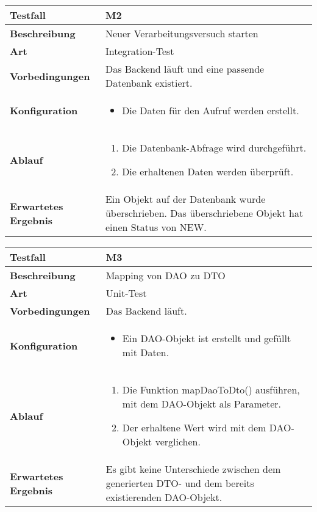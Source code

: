 \begin{longtable}{p{}|p{}}
	\hline
	\textbf{Testfall}               & \textbf{M2} \\
	\hline
	\textbf{Beschreibung}   		& Neuer Verarbeitungsversuch starten \\
	\hline
	\textbf{Art}    				& Integration-Test \\
	\hline
	\textbf{Vorbedingungen}    		& Das Backend läuft und eine passende Datenbank existiert. \\
	\hline
	\textbf{Konfiguration}   	 	& 
	\begin{itemize}
		\item Die Daten für den Aufruf werden erstellt.
	\end{itemize} \\
	\hline
	\textbf{Ablauf}    				& 
	\begin{enumerate}
		\item Die Datenbank-Abfrage wird durchgeführt.
		\item Die erhaltenen Daten werden überprüft.
	\end{enumerate} \\
	\hline
	\textbf{Erwartetes Ergebnis}    & Ein Objekt auf der Datenbank wurde überschrieben. Das überschriebene Objekt hat einen Status von NEW.  \\
	\hline
\end{longtable}\label{tab:testfall-M2}

\begin{longtable}{p{}|p{}}
	\hline
	\textbf{Testfall}               & \textbf{M3} \\
	\hline
	\textbf{Beschreibung}   		& Mapping von DAO zu DTO \\
	\hline
	\textbf{Art}    				& Unit-Test \\
	\hline
	\textbf{Vorbedingungen}    		& Das Backend läuft. \\
	\hline
	\textbf{Konfiguration}   	 	& 
	\begin{itemize}
		\item Ein DAO-Objekt ist erstellt und gefüllt mit Daten.
	\end{itemize} \\
	\hline
	\textbf{Ablauf}    				& 
	\begin{enumerate}
		\item Die Funktion mapDaoToDto() ausführen, mit dem DAO-Objekt als Parameter.
		\item Der erhaltene Wert wird mit dem DAO-Objekt verglichen.
	\end{enumerate} \\
	\hline
	\textbf{Erwartetes Ergebnis}    & Es gibt keine Unterschiede zwischen dem generierten DTO- und dem bereits existierenden DAO-Objekt. \\
	\hline
\end{longtable}\label{tab:testfall-M3}

